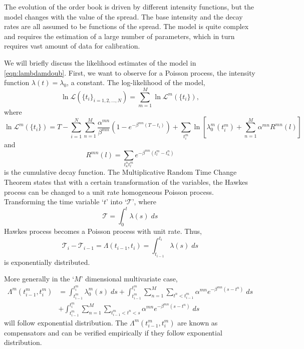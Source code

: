 The evolution of the order book is driven by different intensity functions, but the model changes with the value of the spread. The base intensity and the decay rates are all assumed to be functions of the spread. The model is quite complex and requires the estimation of a large number of parameters, which in turn requires vast amount of data for calibration. 


We will briefly discuss the likelihood estimates of the model in \eqref{eqn:lambdamdoub}. First, we want to observe for a Poisson process, the intensity function $\lambda(t)=\lambda_0$, a constant. The log-likelihood of the model,
	\begin{equation}\label{eqn:loglikemod}
	\ln \mathcal{L}(\{t_i\}_{i=1,2,\ldots,N}) = \sum_{m=1}^M \ln \mathcal{L}^m(\{t_i\}),
	\end{equation}
where
	\[
	\ln \mathcal{L}^m(\{t_i\})= T - \sum_{i=1}^N \sum_{n=1}^M \dfrac{\alpha^{mn}}{\beta^{mn}} (1- e^{-\beta^{mn}(T-t_i)}) + \sum_{t_i^m} \ln[ \lambda_0^m(t_i^m) + \sum_{n=1}^M \alpha^{mn} R^{mn}(l) ]
	\]
and 
	\[
	R^{mn}(l)= \sum_{t_\kappa^n t_l^m} e^{-\beta^{mn}(t_l^m-t_\kappa^n)}
	\]
is the cumulative decay function. The Multiplicative Random Time Change Theorem states that with a certain transformation of the variables, the Hawkes process can be changed to a unit rate homogeneous Poisson process. Transforming the time variable `$t$' into `$\mathcal{T}$', where
	\begin{equation} \label{eqn:calt}
	\mathcal{T}= \int_0^t \lambda(s) \; ds
	\end{equation}
Hawkes process becomes a Poisson process with unit rate. Thus,
	\begin{equation} \label{eqn:diffcalt}
	\mathcal{T}_i - \mathcal{T}_{i-1}= \Lambda(t_{i-1},t_i) = \int_{t_{i-1}}^{t_i} \lambda(s) \; ds
	\end{equation}
is exponentially distributed. 


More generally in the `$M$' dimensional multivariate case,
	\[
	\begin{split}
	\Lambda^m(t_{i-1}^m,t_i^m)&= \int_{t_{i-1}^m}^{t_i^m} \lambda_0^m(s) \; ds + \int_{t_{i-1}^m}^{t_i^m} \sum_{n=1}^M \sum_{t^n<t_{i-1}^m} \alpha^{mn} e^{-\beta^{mn}(s-t^n)} \; ds \\
	&+ \int_{t_{i-1}^m}^{t_i^m} \sum_{n=1}^M \sum_{t_{i-1}^m<t^n<s} \alpha^{mn} e^{-\beta^{mn}(s-t^n)} \; ds
	\end{split}
	\]
will follow exponential distribution. The $\Lambda^m(t_{i-1}^m,t_i^m)$ are known as compensators and can be verified empirically if they follow exponential distribution. \twomedskip


